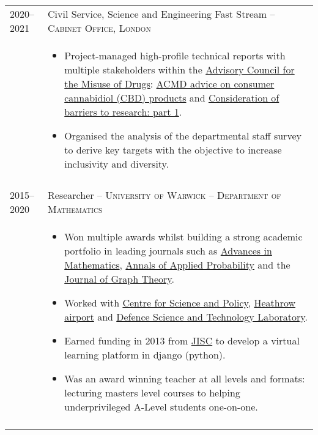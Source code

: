 \documentclass[a4paper,10pt]{article}
\begin{document}
\begin{tabular}{p{2.25cm}|p{15cm}}
%
	\textsc{2020--2021} & \large{Civil Service, Science and Engineering Fast Stream -- \textsc{Cabinet Office, London}}\\
 	 & \vspace{-0.07 in}\begin{itemize}
 	 	\item Project-managed high-profile technical reports with multiple stakeholders within the \href{https://www.gov.uk/government/organisations/advisory-council-on-the-misuse-of-drugs}{Advisory Council for the Misuse of Drugs}: \href{https://www.gov.uk/government/publications/acmd-advice-on-consumer-cannabidiol-cbd-products}{ACMD advice on consumer cannabidiol (CBD) products} and \href{https://www.gov.uk/government/publications/consideration-of-barriers-to-research-part-1}{Consideration of barriers to research: part 1}.
 	 	\item Organised the analysis of the departmental staff survey to derive key targets with the objective to increase inclusivity and diversity.
	\end{itemize}\vspace{-0.15 in}\\
\multicolumn{2}{c}{} \\
%
%
	\textsc{2015--2020} & \large{Researcher -- \textsc{University of Warwick} -- \textsc{Department of Mathematics}}\\
	 & \vspace{-0.07 in}\begin{itemize}
	\item Won multiple awards whilst building a strong academic portfolio in leading journals such as \href{https://www.sciencedirect.com/science/article/pii/S0001870818303347}{Advances in Mathematics}, \href{https://projecteuclid.org/journals/annals-of-applied-probability/volume-32/issue-1/From-the-Bernoulli-factory-to-a-dice-enterprise-via-perfect/10.1214/21-AAP1679.short}{Annals of Applied Probability} and the \href{http://onlinelibrary.wiley.com/doi/10.1002/jgt.22002/abstract}{Journal of Graph Theory}.
	\item Worked with \href{https://www.csap.cam.ac.uk/}{Centre for Science and Policy}, \href{https://www.heathrow.com/}{Heathrow airport} and \href{https://www.gov.uk/government/organisations/defence-science-and-technology-laboratory}{Defence Science and Technology Laboratory}.
	\item Earned funding in 2013 from \href{https://www.jisc.ac.uk/}{JISC} to develop a virtual learning platform in django (python).
	\item Was an award winning teacher at all levels and formats: lecturing masters level courses to helping underprivileged A-Level students one-on-one.
\end{itemize}\vspace{-0.15 in}\\
\multicolumn{2}{c}{} \\
\end{tabular}
\vspace{-0.5cm}
\end{document}
